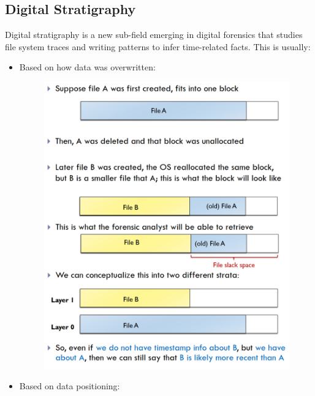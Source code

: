 \documentclass[10pt,a4paper]{report}
\begin{document}
\subsection{Digital Stratigraphy}
Digital stratigraphy is a new sub-field emerging in digital forensics that studies file system traces and writing patterns to infer time-related facts. This is usually:
\begin{itemize}
\item Based on how data was overwritten:
\begin{figure}[H]
\centering
\includegraphics[scale=0.3]{18.png}
\end{figure}
\item Based on data positioning:
\begin{figure}[H]
\centering

\end{figure}
\end{itemize}
\end{document}

